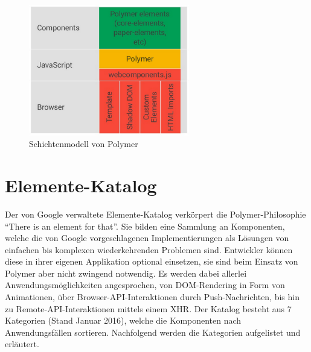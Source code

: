 \begin{figure}[h]
 \centering
 \includegraphics[width=7cm,keepaspectratio]{kapitel3/bilder/1-architektur}
 \caption{Schichtenmodell von Polymer}
 \label{fig:schimopo}
\end{figure}



\section{Elemente-Katalog}\label{elemente-katalog}

Der von Google verwaltete Elemente-Katalog verkörpert die Polymer-Philosophie ``There is an element for that''. Sie bilden eine Sammlung an Komponenten, welche die von Google vorgeschlagenen Implementierungen als Lösungen von einfachen bis komplexen wiederkehrenden Problemen sind. Entwickler können diese in ihrer eigenen Applikation optional einsetzen, sie sind beim Einsatz von Polymer aber nicht zwingend notwendig. Es werden dabei allerlei Anwendungsmöglichkeiten angesprochen, von \ac{DOM}-Rendering in Form von Animationen, über Browser-\ac{API}-Interaktionen durch Push-Nachrichten, bis hin zu Remote-\ac{API}-Interaktionen mittels einem \ac{XHR}. Der Katalog besteht aus 7 Kategorien (Stand Januar 2016), welche die Komponenten nach Anwendungsfällen sortieren. Nachfolgend werden die Kategorien aufgelistet und erläutert.



